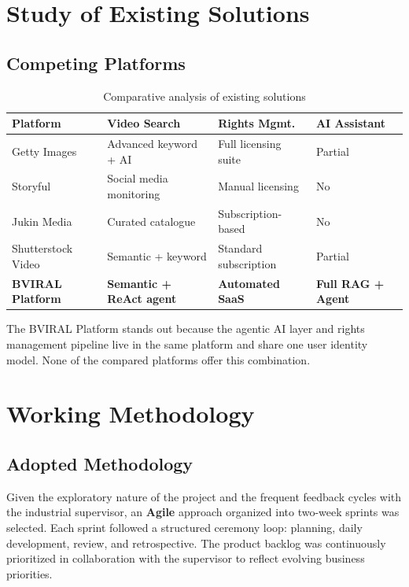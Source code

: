 \section{Study of Existing Solutions}

\subsection{Competing Platforms}

\begin{table}[H]
\centering
\caption{Comparative analysis of existing solutions}
\begin{tabularx}{\textwidth}{lXXX}
\toprule
\textbf{Platform} & \textbf{Video Search} & \textbf{Rights Mgmt.} & \textbf{AI Assistant} \\
\midrule
Getty Images       & Advanced keyword + AI & Full licensing suite & Partial \\
Storyful           & Social media monitoring & Manual licensing & No \\
Jukin Media        & Curated catalogue & Subscription-based & No \\
Shutterstock Video & Semantic + keyword & Standard subscription & Partial \\
\textbf{BVIRAL Platform} & \textbf{Semantic + ReAct agent} & \textbf{Automated SaaS} & \textbf{Full RAG + Agent} \\
\bottomrule
\end{tabularx}
\end{table}

The BVIRAL Platform stands out because the agentic AI layer and rights management pipeline live in
the same platform and share one user identity model. None of the compared platforms offer this
combination.

\section{Working Methodology}

\subsection{Adopted Methodology}

Given the exploratory nature of the project and the frequent feedback cycles with the industrial
supervisor, an \textbf{Agile} approach organized into two-week sprints was selected. Each sprint
followed a structured ceremony loop: planning, daily development, review, and retrospective.
The product backlog was continuously prioritized in collaboration with the supervisor to reflect
evolving business priorities.

